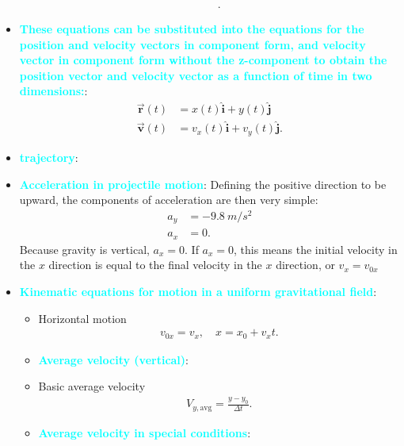 \documentclass{report}
\begin{document}
\begin{itemize}
\begin{itemize}
\begin{align*}
                    .\end{align*}
            \end{itemize}
        \item \textbf{\textcolor{cyan}{These equations can be substituted into the equations for the position and velocity vectors in component form, and velocity vector in component form without the z-component to obtain the position vector and velocity vector as a function of time in two dimensions:}}:
            \begin{align*}
                \vec{\mathbf{r}}(t) &= x(t)\hat{\mathbf{i}} + y(t)\hat{\mathbf{j}}\\
                \vec{\mathbf{v}}(t)&= v_{x}(t)\hat{\mathbf{i}} + v_{y}(t)\hat{\mathbf{j}}
            .\end{align*}
        \item \textbf{\textcolor{cyan}{trajectory}}:
        \item \textbf{\textcolor{cyan}{Acceleration in projectile motion}}: Defining the positive direction to be upward, the components of acceleration are then very simple:
            \begin{align*}
                a_{y} &= -9.8\ m/s^{2} \\
                a_{x} &= 0
            .\end{align*}
             Because gravity is vertical, $a_{x} = 0$. If  $a_{x} = 0$, this means the initial velocity in the $x$ direction is equal to the final velocity in the $x$ direction, or  $v_{x} = v_{0x} $
            \item \textbf{\textcolor{cyan}{Kinematic equations for motion in a uniform gravitational field}}:
                \begin{itemize}
                    \item Horizontal motion 
                        \begin{align*}
                            v_{0x} = v_{x}, \quad x = x_{0} +v_{x}t
                        .\end{align*}
                    \item \textbf{\textcolor{cyan}{Average velocity (vertical)}}:
                    \item Basic average velocity 
                        \begin{align*}
                            V_{y,\text{avg}} = \frac{y-y_{0}}{\Delta t}
                        .\end{align*}
                    \item \textbf{\textcolor{cyan}{Average velocity in special conditions}}:

\end{itemize}
\end{itemize}
\end{document}
